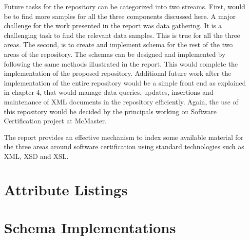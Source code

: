 \documentclass[11pt,letterpaper]{report}
\begin{document}
Future tasks for the repository can be categorized into two streams. First, would be to find more samples for all the three components discussed here. A major challenge for the work presented in the report was data gathering. It is a challenging task to find the relevant data samples. This is true for all the three areas. The second, is to create and implement schema for the rest of the two areas of the repository. The schemas can be designed and implemented by following the same methods illustrated in the report. This would complete the implementation of the proposed repository. Additional future work after the implementation of the entire repository would be a simple front end as explained in chapter 4, that would manage data queries, updates, insertions and maintenance of XML documents in the repository efficiently. Again, the use of this repository would be decided by the principals working on Software Certification project at McMaster.  

The report provides an effective mechanism to index some available material for the three areas around software certification using standard technologies such as XML, XSD and XSL.

\appendix
\chapter{Attribute Listings}


 

 

  

\chapter{Schema Implementations}



\end{document}
